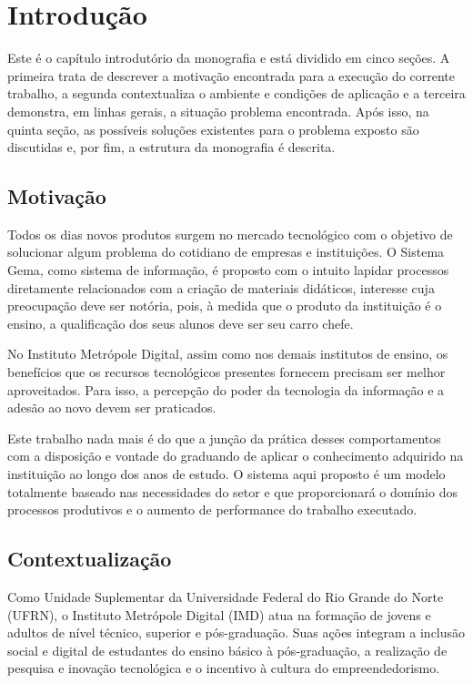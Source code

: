 \chapter{Introdução}

Este é o capítulo introdutório da monografia e está dividido em cinco seções. A primeira trata de descrever a motivação encontrada para a execução do corrente trabalho, a segunda contextualiza o ambiente e condições de aplicação e a terceira demonstra, em linhas gerais, a situação problema encontrada. Após isso, na quinta seção, as possíveis soluções existentes para o problema exposto são discutidas e, por fim, a estrutura da monografia é descrita.

\section{Motivação}

Todos os dias novos produtos surgem no mercado tecnológico com o objetivo de solucionar algum problema do cotidiano de empresas e instituições. O Sistema Gema, como sistema de informação, é proposto com o intuito lapidar processos diretamente relacionados com a criação de materiais didáticos, interesse cuja preocupação deve ser notória, pois, à medida que o produto da instituição é o ensino, a qualificação dos seus alunos deve ser seu carro chefe.

No Instituto Metrópole Digital, assim como nos demais institutos de ensino, os benefícios que os recursos tecnológicos presentes fornecem precisam ser melhor aproveitados. Para isso, a percepção do poder da tecnologia da informação e a adesão ao novo devem ser praticados. 

Este trabalho nada mais é do que a junção da prática desses comportamentos com a disposição e vontade do graduando de aplicar o conhecimento adquirido na instituição ao longo dos anos de estudo. O sistema aqui proposto é um modelo totalmente baseado nas necessidades do setor e que proporcionará o domínio dos processos produtivos e o aumento de performance do trabalho executado.

\section{Contextualização}

Como Unidade Suplementar da Universidade Federal do Rio Grande do Norte (UFRN), o Instituto Metrópole Digital (IMD) atua na formação de jovens e adultos de nível técnico, superior e pós-graduação. Suas ações integram a inclusão social e digital de estudantes do ensino básico à pós-graduação, a realização de pesquisa e inovação tecnológica e o incentivo à cultura do empreendedorismo.

